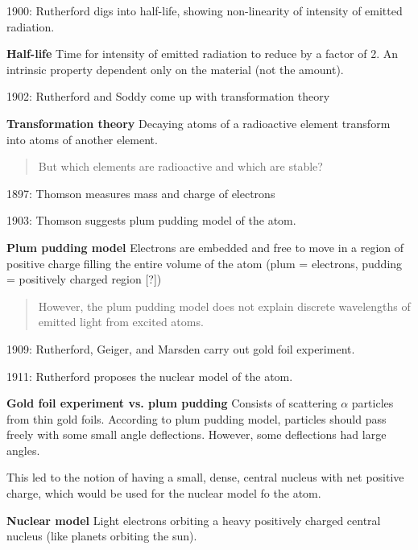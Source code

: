 \documentclass[11pt]{article}
\theoremstyle{definition}
\begin{document}
1900: Rutherford digs into half-life, showing non-linearity of intensity of emitted radiation.

\begin{shaded}
    \textbf{Half-life} \newline
    Time for intensity of emitted radiation to reduce by a factor of 2. An intrinsic property dependent only on the material (not the amount). 
\end{shaded}

1902: Rutherford and Soddy come up with transformation theory

\begin{shaded}
    \textbf{Transformation theory} \newline
    Decaying atoms of a radioactive element transform into atoms of another element.
\end{shaded}

\begin{quote}
    But which elements are radioactive and which are stable?
\end{quote}

1897: Thomson measures mass and charge of electrons

1903: Thomson suggests plum pudding model of the atom.

\begin{shaded}
    \textbf{Plum pudding model} \newline
    Electrons are embedded and free to move in a region of positive charge filling the entire volume of the atom (plum = electrons, pudding = positively charged region [?])
\end{shaded}

\begin{quote}
    However, the plum pudding model does not explain discrete wavelengths of emitted light from excited atoms.
\end{quote}


1909: Rutherford, Geiger, and Marsden carry out gold foil experiment.

1911: Rutherford proposes the nuclear model of the atom.

\begin{shaded}
    \textbf{Gold foil experiment vs. plum pudding} \newline
    Consists of scattering $\alpha$ particles from thin gold foils. According to plum pudding model, particles should pass freely with some small angle deflections. However, some deflections had large angles.

    This led to the notion of having a small, dense, central nucleus with net positive charge, which would be used for the nuclear model fo the atom.

    \textbf{Nuclear model} \newline
    Light electrons orbiting a heavy positively charged central nucleus (like planets orbiting the sun). 
\end{shaded}
\end{document}
